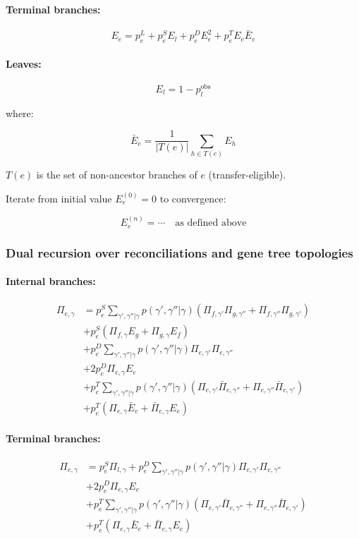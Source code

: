 \paragraph{Terminal branches:}
\[
E_e = p^L_e + p^S_e E_l + p^D_e E_e^2 + p^T_e E_e \bar{E}_e
\]

\paragraph{Leaves:}
\[
E_l = 1 - p^{\text{obs}}_l
\]

where:

\[
\bar{E}_e = \frac{1}{|T(e)|} \sum_{h \in T(e)} E_h
\]

$T(e)$ is the set of non-ancestor branches of $e$ (transfer-eligible).

Iterate from initial value $E_e^{(0)} = 0$ to convergence:

\[
E_e^{(n)} = \cdots \quad \text{as defined above}
\]

\subsubsection{Dual recursion over reconciliations and gene tree topologies}

\paragraph{Internal branches:}
\begin{align}
\Pi_{e,\gamma} &= p^S_e \sum_{\gamma',\gamma''|\gamma} p(\gamma',\gamma''|\gamma) \left( \Pi_{f,\gamma'} \Pi_{g,\gamma''} + \Pi_{f,\gamma''} \Pi_{g,\gamma'} \right) \\
&+ p^S_e (\Pi_{f,\gamma} E_g + \Pi_{g,\gamma} E_f) \\
&+ p^D_e \sum_{\gamma',\gamma''|\gamma} p(\gamma',\gamma''|\gamma) \Pi_{e,\gamma'} \Pi_{e,\gamma''} \\
&+ 2 p^D_e \Pi_{e,\gamma} E_e \\
&+ p^T_e \sum_{\gamma',\gamma''|\gamma} p(\gamma',\gamma''|\gamma) \left( \Pi_{e,\gamma'} \bar{\Pi}_{e,\gamma''} + \Pi_{e,\gamma''} \bar{\Pi}_{e,\gamma'} \right) \\
&+ p^T_e (\Pi_{e,\gamma} \bar{E}_e + \bar{\Pi}_{e,\gamma} E_e)
\end{align}

\paragraph{Terminal branches:}
\begin{align}
\Pi_{e,\gamma} &= p^S_e \Pi_{l,\gamma} + p^D_e \sum_{\gamma',\gamma''|\gamma} p(\gamma',\gamma''|\gamma) \Pi_{e,\gamma'} \Pi_{e,\gamma''} \\
&+ 2 p^D_e \Pi_{e,\gamma} E_e \\
&+ p^T_e \sum_{\gamma',\gamma''|\gamma} p(\gamma',\gamma''|\gamma) \left( \Pi_{e,\gamma'} \bar{\Pi}_{e,\gamma''} + \Pi_{e,\gamma''} \bar{\Pi}_{e,\gamma'} \right) \\
&+ p^T_e (\Pi_{e,\gamma} \bar{E}_e + \bar{\Pi}_{e,\gamma} E_e)
\end{align}

